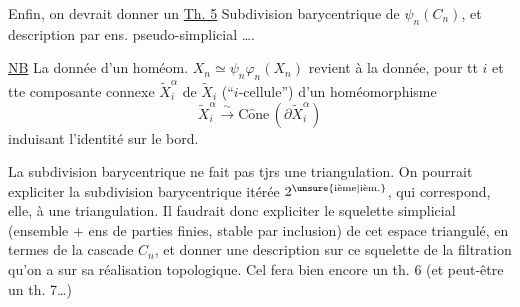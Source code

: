 Enfin, on devrait donner un
\uline{Th. 5} Subdivision barycentrique de $\psi_n(C_n)$, et description par ens. pseudo-simplicial \ldots.

\uline{NB} La donnée d'un homéom. $X_n\simeq\psi_n\varphi_n(X_n)$ revient à la donnée, pour tt $i$ et tte composante connexe $\widetilde X_i^\alpha$ de $\widetilde X_i$ (``$i$-cellule'') d'un homéomorphisme
\[ \widetilde X_i^\alpha\xrightarrow{\sim}\mathrm{C\hat{o}ne}\,(\partial\widetilde X_i^\alpha) \]
induisant l'identité sur le bord.

La subdivision barycentrique ne fait pas tjrs une triangulation.
On pourrait expliciter la subdivision barycentrique itérée $2^{\text{\unsure{ième|ièm.}}}$, qui correspond, elle, à une triangulation. Il faudrait donc expliciter  le squelette simplicial (ensemble $+$ ens de parties finies, stable par inclusion) de cet espace triangulé, en termes de la cascade $C_n$, et donner une description sur ce  squelette de la filtration qu'on a sur sa réalisation topologique. Cel fera bien encore un th. 6 (et peut-être un th. 7\ldots)
